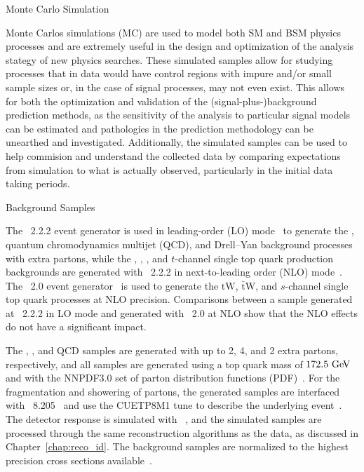 \begin{section}{Monte Carlo Simulation}

Monte Carlos simulations (MC) are used to model both SM and BSM physics processes and are extremely useful in the design and optimization of the analysis stategy of new physics searches.
These simulated samples allow for studying processes that in data would have control regions with impure and/or small sample sizes or, in the case of signal processes, may not even exist.
This allows for both the optimization and validation of the (signal-plus-)background prediction methods, as the sensitivity of the analysis to particular signal models can be estimated and pathologies in the prediction methodology can be unearthed and investigated.
Additionally, the simulated samples can be used to help commision and understand the collected data by comparing expectations from simulation to what is actually observed, particularly in the initial data taking periods.

\begin{subsection}{Background Samples}

The \MGatNLO~2.2.2 event generator is used in leading-order (LO) mode~\cite{Alwall:2014hca,Alwall:2007fs} to generate the
\ttbar, quantum chromodynamics multijet (QCD), \Wjets and Drell--Yan background processes with extra partons, while the \ttW, \ttZ, \tttt, and $t$-channel single top quark production backgrounds are generated with \MGatNLO~2.2.2 in next-to-leading order (NLO) mode~\cite{Frederix:2012ps}.
The \POWHEG~2.0 event generator~\cite{Nason:2004rx,Frixione:2007vw,Alioli:2010xd} is used to generate the $\mathrm{tW}$, $\mathrm{\bar{t}W}$, and $s$-channel single top quark processes at NLO precision.
Comparisons between a sample generated at \MGatNLO~2.2.2 in LO mode and generated with \POWHEG~2.0 at NLO show that the NLO effects do not have a significant impact.

The \ttbar, \Wjets, and QCD samples are generated with up to 2, 4, and 2 extra partons, respectively, and all samples are generated using a top quark mass of $172.5~\mathrm{Ge\kern -0.1em V}$ and with the NNPDF3.0 set of parton distribution functions (PDF)~\cite{Ball:2014uwa}.
For the fragmentation and showering of partons, the generated samples are interfaced with \PYTHIA~8.205~\cite{pythia8.2} and use the CUETP8M1 tune to describe the underlying event~\cite{Skands2014}.
The detector response is simulated with \GEANTfour~\cite{Agostinelli:2002hh}, and the simulated samples are processed through the same reconstruction algorithms as the data, as discussed in Chapter~\ref{chap:reco_id}.
The background samples are normalized to the highest precision cross sections available~\cite{PhysRevLett.110.252004,Gavin:2012sy,Alioli:2009je,Re:2010bp,Frixione:2015zaa,Bevilacqua:2012em,Nagy:2001fj}.


\end{subsection}
\end{section}
